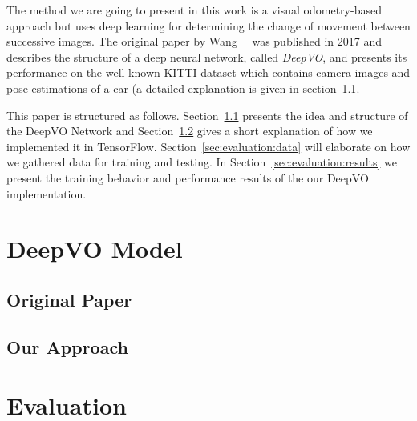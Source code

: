 \documentclass[a4paper,11pt]{article}
\begin{document}
The method we are going to present in this work is a visual odometry-based approach but uses deep learning for determining the change of movement between successive images. The original paper by Wang~\etal~\cite{wang2017deepvo} was published in 2017 and describes the structure of a deep neural network, called \emph{DeepVO}, and presents its performance on the well-known KITTI dataset which contains camera images and pose estimations of a car (a detailed explanation is given in section~\ref{sec:deepvo:original}.

This paper is structured as follows. Section~\ref{sec:deepvo:original} presents the idea and structure of the DeepVO Network and Section~\ref{sec:deepvo:approach} gives a short explanation of how we implemented it in TensorFlow. Section~\ref{sec:evaluation:data} will elaborate on how we gathered data for training and testing. In Section~\ref{sec:evaluation:results} we present the training behavior and performance results of the our DeepVO implementation.


\section{DeepVO Model}
\label{sec:deepvo}


\subsection{Original Paper}
\label{sec:deepvo:original}


\subsection{Our Approach}
\label{sec:deepvo:approach}


\section{Evaluation}
\label{sec:evaluation}
\end{document}
